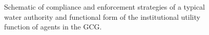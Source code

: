 \documentclass[12pt, a4paper]{article}
\begin{document}
\begin{figure}
	\caption{Schematic of compliance and enforcement strategies of a typical water authority 
	\autocite{Holley:2012tg,Ayres:1992vm,Braithwaite:2012wb} and functional form of the institutional utility function of agents in the GCG.} 	\label{Fig: CH3_GCG1_Institutional utility function} 
	\begin{center}
	\end{center}
\end{figure}
\end{document}
